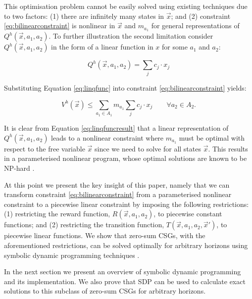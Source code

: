 This optimisation problem cannot be easily solved using existing techniques
due to two factors: (1) there are infinitely many states in $\vec{x}$; and
(2) constraint \eqref{eq:bilinearconstraint} is nonlinear in $\vec{x}$ and 
$m_{a_{1}}$ for general representations of {\small $Q^{h}(\vec{x}, a_1, a_2)$}. 
To further illustration the second limitation consider 
$Q^{h}(\vec{x}, a_1, a_2)$ in the form of a linear function in $x$ for some
$a_1$ and $a_2$:

{\small 
\begin{equation}
Q^{h}(\vec{x}, a_1, a_2) = \sum_{j} c_j \cdot x_j \label{eq:linqfunc}
\end{equation}
}%

Substituting Equation \ref{eq:linqfunc} into constraint \ref{eq:bilinearconstraint}
yields:

{\small 
\begin{equation}
V^{h}(\vec{x}) \leq \sum_{a_1 \in A_1} m_{a_{1}} \sum_{j} c_j \cdot x_j \qquad \forall a_2 \in A_2. \label{eq:linqfuncresult}
\end{equation}
}%

It is clear from Equation \ref{eq:linqfuncresult} that a linear representation
of $Q^{h}(\vec{x}, a_1, a_2)$ leads to a nonlinear constraint
where $m_{a_{1}}$ must be optimal with respect to the free variable
$\vec{x}$ since we need to solve for all states $\vec{x}$. This results in 
a parameterised nonlinear program, whose optimal solutions are known to be
NP-hard \cite{Bennett_COA_1993,Petrik_JoMLR_2011}.

At this point we present the key insight of this paper, namely that we
can transform constraint \eqref{eq:bilinearconstraint} from a parameterised 
nonlinear constraint to a piecewise linear constraint by imposing the 
following restrictions: (1) restricting the reward function, {\small $R(\vec{x}, a_1, a_2)$}, 
to piecewise constant functions; and (2) restricting the transition function, 
{\small $T(\vec{x}, a_1, a_2, \vec{x}')$}, to piecewise linear functions.
We show that zero-sum CSGs, with the aforementioned
restrictions, can be solved optimally for arbitrary horizons using 
symbolic dynamic programming techniques \cite{Zamani_AAAI_2012}.

In the next section we present an overview of symbolic dynamic 
programming and its implementation. We also prove that SDP can be
used to calculate exact solutions to this subclass of zero-sum CSGs for
arbitrary horizons.
